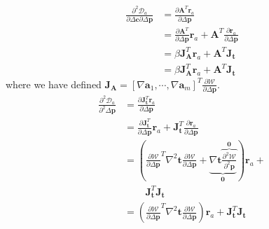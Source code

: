 \begin{equation}
    \begin{aligned}
		\frac{\partial^2 \mathcal{D}_a}{\partial \Delta \mathbf{c} \partial \Delta \mathbf{p}} & = \frac{\partial \mathbf{A}^T \mathbf{r}_a}{\partial \Delta \mathbf{p}}
		\\
		& = \frac{\partial \mathbf{A}^T}{\partial \Delta \mathbf{p}} \mathbf{r}_a + \mathbf{A}^T \frac{\partial\mathbf{r}_a}{\partial \Delta \mathbf{p}}
		\\
		& = \beta \mathbf{J}_\mathbf{A}^T \mathbf{r}_a +  \mathbf{A}^T \mathbf{J}_{\mathbf{t}}
		\\
		& = \beta \mathbf{J}_\mathbf{A}^T \mathbf{r}_a +  \mathbf{A}^T \mathbf{J}_{\mathbf{t}}
    \label{eq:asymmetric_hessian_term2}
    \end{aligned}
\end{equation}
where we have defined $\mathbf{J}_\mathbf{A} = [\nabla \mathbf{a}_1, \cdots, \nabla \mathbf{a}_m]^T \frac{\partial\mathcal{W}}{\partial \Delta \mathbf{p}}$.
\begin{equation}
    \begin{aligned}
		\frac{\partial^2 \mathcal{D}_a}{\partial^2 \Delta \mathbf{p}} & =  \frac{\partial \mathbf{J}_{\mathbf{t}}^T \mathbf{r}_a}{\partial \Delta \mathbf{p}} 
		\\
		& = \frac{\partial \mathbf{J}_{\mathbf{t}}^T}{\partial \Delta \mathbf{p}} \mathbf{r}_a + \mathbf{J}_{\mathbf{t}}^T \frac{\partial \mathbf{r}_a}{\partial \Delta \mathbf{p}} 
		\\
		& = \left( \frac{\partial\mathcal{W}}{\partial \Delta \mathbf{p}}^T \nabla^2 \mathbf{t} \frac{\partial\mathcal{W}}{\partial \Delta \mathbf{p}} + \underbrace{\nabla \mathbf{t} \overbrace{\frac{\partial^2 \mathcal{W}}{\partial^2 \mathbf{p}}}^{\mathbf{0}}}_{\mathbf{0}} \right) \mathbf{r}_a +
		\\
		& \qquad \, \mathbf{J}_{\mathbf{t}}^T \mathbf{J}_{\mathbf{t}}
		\\
		& = \left( \frac{\partial\mathcal{W}}{\partial \Delta \mathbf{p}}^T \nabla^2 \mathbf{t} \frac{\partial\mathcal{W}}{\partial \Delta \mathbf{p}} \right) \mathbf{r}_a + \mathbf{J}_{\mathbf{t}}^T \mathbf{J}_{\mathbf{t}} 
    \label{eq:asymmetric_hessian_term3}
    \end{aligned}
\end{equation}

